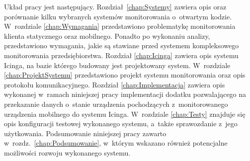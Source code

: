 Układ pracy jest następujący. Rozdział~\ref{chap:Systemy} zawiera opis
oraz porównanie kilku wybranych systemów monitorowania o~otwartym
kodzie. W~rozdziale \ref{chap:Wymagania} przedstawiono problematykę
monitorowania klienta statycznego oraz mobilnego. Ponadto po wykonaniu
analizy, przedstawiono wymagania, jakie są stawiane przed systemem
kompleksowego monitorowania przedsiębiorstwa. Rozdział
\ref{chap:Icinga} zawiera opis systemu Icinga, na bazie którego
budowany jest projektowany system. W~rozdziale
\ref{chap:ProjektSystemu} przedstawiono projekt systemu monitorowania
oraz opis protokołu komunikacyjnego. Rozdział \ref{chap:Implementacja}
zawiera opis wykonanej w~ramach niniejszej pracy implementacji dodatku
pozwalającego na przekazanie danych o~stanie urządzenia pochodzących
z~monitorowanego urządzenia mobilnego do systemu Icinga. W~rozdziale
\ref{chap:Testy} znajduje się opis konfiguracji testowej wykonanego
systemu, a~także sprawozdanie z~jego użytkowania. Podsumowanie
niniejszej pracy zawarto w~rozdz.~\ref{chap:Podsumowanie}, w~którym
wskazano również potencjalne możliwości rozwoju wykonanego systemu.
